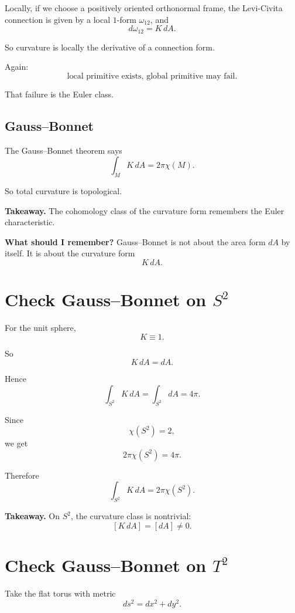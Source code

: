 \documentclass[11pt]{article}
\newenvironment{takeaway}
{\begin{framed}\noindent\textbf{Takeaway. }}
{\end{framed}}
\newenvironment{remember}
{\begin{framed}\noindent\textbf{What should I remember? }}
{\end{framed}}
\begin{document}
Locally, if we choose a positively oriented orthonormal frame, the Levi-Civita connection is given by a local \(1\)-form \(\omega_{12}\), and
\[
d\omega_{12}=K\,dA.
\]

So curvature is locally the derivative of a connection form.

Again:
\[
\text{local primitive exists, global primitive may fail.}
\]

That failure is the Euler class.

\subsection{Gauss--Bonnet}

The Gauss--Bonnet theorem says
\[
\int_M K\,dA = 2\pi\chi(M).
\]

So total curvature is topological.

\begin{takeaway}
The cohomology class of the curvature form remembers the Euler characteristic.
\end{takeaway}

\begin{remember}
Gauss--Bonnet is not about the area form \(dA\) by itself. It is about the curvature form
\[
K\,dA.
\]
\end{remember}

\section{Check Gauss--Bonnet on \(S^2\)}

For the unit sphere,
\[
K\equiv 1.
\]

So
\[
K\,dA=dA.
\]

Hence
\[
\int_{S^2}K\,dA
=
\int_{S^2}dA
=
4\pi.
\]

Since
\[
\chi(S^2)=2,
\]
we get
\[
2\pi\chi(S^2)=4\pi.
\]

Therefore
\[
\int_{S^2}K\,dA=2\pi\chi(S^2).
\]

\begin{takeaway}
On \(S^2\), the curvature class is nontrivial:
\[
[K\,dA]=[dA]\neq 0.
\]
\end{takeaway}

\section{Check Gauss--Bonnet on \(T^2\)}

Take the flat torus with metric
\[
ds^2=dx^2+dy^2.
\]
\end{document}
